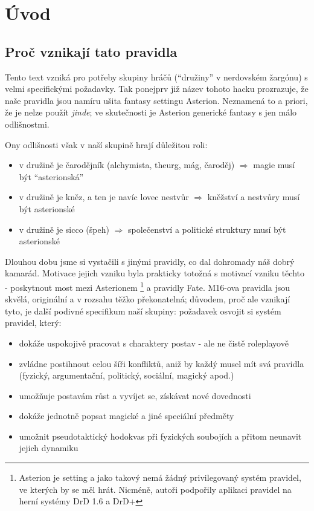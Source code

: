 \documentclass[../main.tex]{subfiles}
\begin{document}
\chapter{Úvod}
\label{chap:introduction}

\section{Proč vznikají tato pravidla}
\label{sec:proc-pravidla}

Tento text vzniká pro potřeby skupiny hráčů (``družiny'' v nerdovském žargónu) s velmi specifickými požadavky. Tak ponejprv již název tohoto hacku prozrazuje, že naše pravidla jsou namíru ušita fantasy settingu Asterion. Neznamená to a priori, že je nelze použít \textit{jinde}; ve skutečnosti je Asterion generické fantasy s jen málo odlišnostmi. 

Ony odlišnosti však v naší skupině hrají důležitou roli:

\begin{itemize}
\item v družině je čarodějník (alchymista, theurg, mág, čaroděj) $\Rightarrow$ magie musí být ``asterionská''
\item v družině je kněz, a ten je navíc lovec nestvůr $\Rightarrow$ kněžství a nestvůry musí být asterionské
\item v družině je sicco (špeh) $\Rightarrow$ společenství a politické struktury musí být asterionské
\end{itemize}

Dlouhou dobu jsme si vystačili s jinými pravidly, co dal dohromady náš dobrý kamarád. Motivace jejich vzniku byla prakticky totožná s motivací vzniku těchto - poskytnout most mezi Asterionem \footnote{Asterion je setting a jako takový nemá žádný privilegovaný systém pravidel, ve kterých by se měl hrát. Nicméně, autoři podpořily aplikaci pravidel na herní systémy DrD 1.6 a DrD+} a pravidly Fate. M16-ova pravidla jsou skvělá, originální a v rozsahu těžko překonatelná; důvodem, proč ale vznikají tyto, je další podivné specifikum naší skupiny: požadavek osvojit si systém pravidel, který:

\begin{itemize}
\item dokáže uspokojivě pracovat s charaktery postav - ale ne čistě roleplayově
\item zvládne postihnout celou šíři konfliktů, aniž by každý musel mít svá pravidla (fyzický, argumentační, politický, sociální, magický apod.)
\item umožňuje postavám růst a vyvíjet se, získávat nové dovednosti
\item dokáže jednotně popsat magické a jiné speciální předměty
\item umožnit pseudotaktický hodokvas při fyzických soubojích a přitom neunavit jejich dynamiku
\end{itemize}
\end{document}
